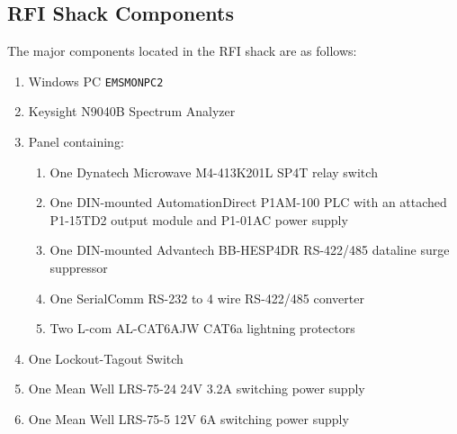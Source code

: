\documentclass[titlepage]{article}
\begin{document}
\subsection{RFI Shack Components}\label{sec:higshack}
The major components located in the RFI shack are as follows:
\begin{enumerate}
  \item Windows PC \verb|EMSMONPC2|
  \item Keysight N9040B Spectrum Analyzer
  \item Panel containing:
  \begin{enumerate}
    \item One Dynatech Microwave M4-413K201L SP4T relay switch
    \item One DIN-mounted AutomationDirect P1AM-100 PLC with an attached P1-15TD2 output module and P1-01AC power supply
    \item One DIN-mounted Advantech BB-HESP4DR RS-422/485 dataline surge suppressor
    \item One SerialComm RS-232 to 4 wire RS-422/485 converter
    \item Two L-com AL-CAT6AJW CAT6a lightning protectors
  \end{enumerate}
  \item One Lockout-Tagout Switch
  \item One Mean Well LRS-75-24 24V 3.2A switching power supply
  \item One Mean Well LRS-75-5 12V 6A switching power supply
\end{enumerate}
\end{document}
